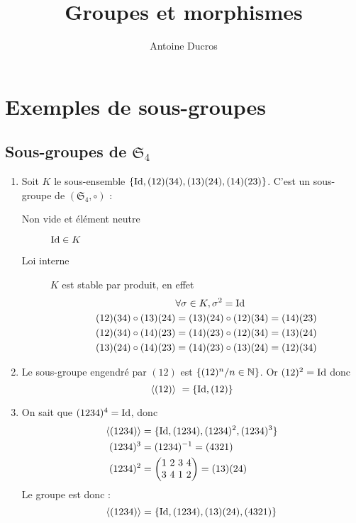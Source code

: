 \documentclass[12pt,a4paper,final]{article}
\author{Antoine Ducros}
\title{Groupes et morphismes}
\begin{document}
	\maketitle
	\section{Exemples de sous-groupes}
		\subsection{Sous-groupes de $\mathfrak{S}_4$}
			\begin{enumerate}
			\item Soit $K$ le sous-ensemble $\{\operatorname{Id}, (12)(34), (13)(24), (14)(23) \}$.
				C'est un sous-groupe de $(\mathfrak{S}_4, \circ)$ :
				\begin{description}
					\item[Non vide et \'el\'ement neutre] $\operatorname{Id}\in K$
					\item[Loi interne] $K$ est stable par produit, en effet
						\begin{align*}
							&\forall \sigma \in K, \sigma^2 = \operatorname{Id} \\
							(12)(34)\circ(13)(24) &= (13)(24)\circ(12)(34) = (14)(23) \\
							(12)(34)\circ(14)(23) &= (14)(23)\circ(12)(34) = (13)(24) \\
							(13)(24)\circ(14)(23) &= (14)(23)\circ(13)(24) = (12)(34)
						\end{align*}
				\end{description}
			\item Le sous-groupe engendr\'e par $(12)$ est $\{(12)^n / n\in\mathbb{N}\}$.
				Or $(12)^2=\operatorname{Id}$ donc
				\[ \langle(12)\rangle ~ =\{\operatorname{Id}, (12)\} \]
			\item On sait que $(1234)^4=\operatorname{Id}$, donc
			\begin{align*}
				\langle(1234)\rangle &= \{ \operatorname{Id}, (1234), (1234)^2 , (1234)^3 \} \\
				(1234)^3 &= (1234)^{-1} = (4321) \\
				(1234)^2 &=
					\left(\begin{matrix}
						1~2~3~4 \\
						3~4~1~2
					\end{matrix}\right)
					= (13)(24)
			\end{align*}
			Le groupe est donc :
			\[ \langle(1234)\rangle = \{\operatorname{Id},(1234),(13)(24),(4321)\} \]
			\end{enumerate}
\end{document}

